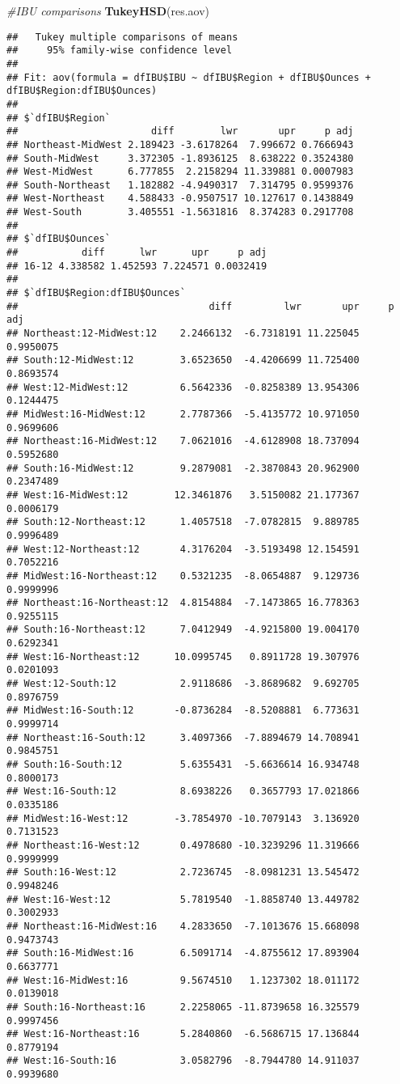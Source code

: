 \documentclass[
]{article}
\newenvironment{Shaded}{\begin{snugshade}}{\end{snugshade}}
\newcommand{\CommentTok}[1]{\textcolor[rgb]{0.56,0.35,0.01}{\textit{#1}}}
\newcommand{\KeywordTok}[1]{\textcolor[rgb]{0.13,0.29,0.53}{\textbf{#1}}}
\newcommand{\NormalTok}[1]{#1}
\begin{document}
\begin{Shaded}
\begin{Highlighting}[]
\CommentTok{#IBU comparisons}
\KeywordTok{TukeyHSD}\NormalTok{(res.aov)}
\end{Highlighting}
\end{Shaded}

\begin{verbatim}
##   Tukey multiple comparisons of means
##     95% family-wise confidence level
## 
## Fit: aov(formula = dfIBU$IBU ~ dfIBU$Region + dfIBU$Ounces + dfIBU$Region:dfIBU$Ounces)
## 
## $`dfIBU$Region`
##                       diff        lwr       upr     p adj
## Northeast-MidWest 2.189423 -3.6178264  7.996672 0.7666943
## South-MidWest     3.372305 -1.8936125  8.638222 0.3524380
## West-MidWest      6.777855  2.2158294 11.339881 0.0007983
## South-Northeast   1.182882 -4.9490317  7.314795 0.9599376
## West-Northeast    4.588433 -0.9507517 10.127617 0.1438849
## West-South        3.405551 -1.5631816  8.374283 0.2917708
## 
## $`dfIBU$Ounces`
##           diff      lwr      upr     p adj
## 16-12 4.338582 1.452593 7.224571 0.0032419
## 
## $`dfIBU$Region:dfIBU$Ounces`
##                                 diff         lwr       upr     p adj
## Northeast:12-MidWest:12    2.2466132  -6.7318191 11.225045 0.9950075
## South:12-MidWest:12        3.6523650  -4.4206699 11.725400 0.8693574
## West:12-MidWest:12         6.5642336  -0.8258389 13.954306 0.1244475
## MidWest:16-MidWest:12      2.7787366  -5.4135772 10.971050 0.9699606
## Northeast:16-MidWest:12    7.0621016  -4.6128908 18.737094 0.5952680
## South:16-MidWest:12        9.2879081  -2.3870843 20.962900 0.2347489
## West:16-MidWest:12        12.3461876   3.5150082 21.177367 0.0006179
## South:12-Northeast:12      1.4057518  -7.0782815  9.889785 0.9996489
## West:12-Northeast:12       4.3176204  -3.5193498 12.154591 0.7052216
## MidWest:16-Northeast:12    0.5321235  -8.0654887  9.129736 0.9999996
## Northeast:16-Northeast:12  4.8154884  -7.1473865 16.778363 0.9255115
## South:16-Northeast:12      7.0412949  -4.9215800 19.004170 0.6292341
## West:16-Northeast:12      10.0995745   0.8911728 19.307976 0.0201093
## West:12-South:12           2.9118686  -3.8689682  9.692705 0.8976759
## MidWest:16-South:12       -0.8736284  -8.5208881  6.773631 0.9999714
## Northeast:16-South:12      3.4097366  -7.8894679 14.708941 0.9845751
## South:16-South:12          5.6355431  -5.6636614 16.934748 0.8000173
## West:16-South:12           8.6938226   0.3657793 17.021866 0.0335186
## MidWest:16-West:12        -3.7854970 -10.7079143  3.136920 0.7131523
## Northeast:16-West:12       0.4978680 -10.3239296 11.319666 0.9999999
## South:16-West:12           2.7236745  -8.0981231 13.545472 0.9948246
## West:16-West:12            5.7819540  -1.8858740 13.449782 0.3002933
## Northeast:16-MidWest:16    4.2833650  -7.1013676 15.668098 0.9473743
## South:16-MidWest:16        6.5091714  -4.8755612 17.893904 0.6637771
## West:16-MidWest:16         9.5674510   1.1237302 18.011172 0.0139018
## South:16-Northeast:16      2.2258065 -11.8739658 16.325579 0.9997456
## West:16-Northeast:16       5.2840860  -6.5686715 17.136844 0.8779194
## West:16-South:16           3.0582796  -8.7944780 14.911037 0.9939680
\end{verbatim}
\end{document}
